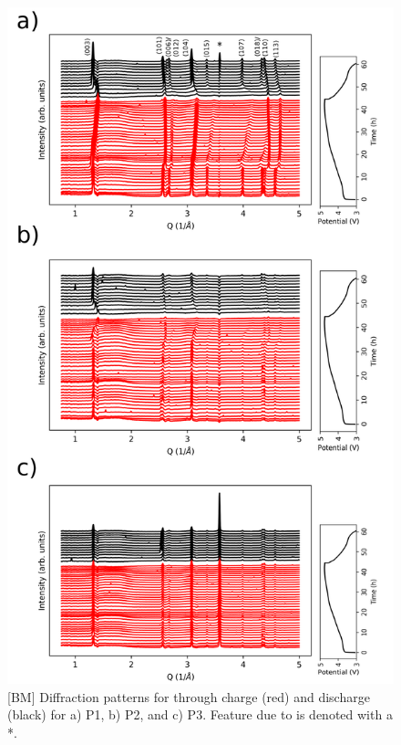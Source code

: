 \documentclass{article}
\begin{document}
\begin{figure}
\centering   
  \includegraphics[width=\linewidth, height=\textheight, keepaspectratio]{figures/p1-3-xrd.png}
  \caption{[BM] Diffraction patterns for \nca{} through charge (red)
    and discharge (black) for a) P1, b) P2, and c) P3. Feature due to
     is denoted with a *.}
  \label{fig:xrd-echem}
\end{figure}
\end{document}
